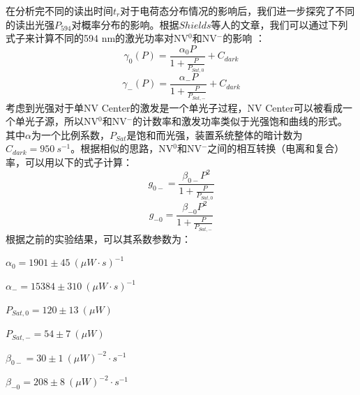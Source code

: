 \documentclass[type = bachelor]{whu-thesis}
\begin{document}
在分析完不同的读出时间$t_r$对于电荷态分布情况的影响后，我们进一步探究了不同的读出光强$P_{594}$对概率分布的影响。根据$Shields$等人的文章，我们可以通过下列式子来计算不同的594 nm的激光功率对NV$^0$和NV$^-$的影响 \cite{Shields2015}：
\begin{equation}
  \gamma_0(P)=\frac{\alpha_0 P}{1+\frac{P}{P_{Sat,0}}}+C_{dark}
  \label{equ: gamma_0}
\end{equation}
\begin{equation}
  \gamma_-(P)=\frac{\alpha_- P}{1+\frac{P}{P_{Sat,-}}}+C_{dark}
  \label{equ: gamma_-}
\end{equation}
考虑到光强对于单NV Center的激发是一个单光子过程，NV Center可以被看成一个单光子源，所以NV$^0$和NV$^-$的计数率和激发功率类似于光强饱和曲线的形式。其中$\alpha$为一个比例系数，$P_{Sat}$是饱和而光强，装置系统整体的暗计数为$C_{dark} = 950\ s^{-1}$。根据相似的思路，NV$^0$和NV$^-$之间的相互转换（电离和复合）率，可以用以下的式子计算：
\begin{equation}
  g_{0-} = \frac{\beta_{0-}P^2}{1+\frac{P}{P_{Sat,0}}}
  \label{equ: g_0-}
\end{equation}
\begin{equation}
  g_{-0} = \frac{\beta_{-0}P^2}{1+\frac{P}{P_{Sat,-}}}
  \label{equ: g_-0}
\end{equation}
根据之前的实验结果，可以其系数参数为\cite{Robledo2011}：

$\alpha_0 = 1901 \pm 45\ (\mu W \cdot s)^{-1}$

$\alpha_- = 15384 \pm 310\ (\mu W \cdot s)^{-1}$

$P_{Sat,0} = 120 \pm 13\ (\mu W)$

$P_{Sat,-} = 54 \pm 7\ (\mu W)$

$\beta_{0-} = 30 \pm 1\ (\mu W)^{-2} \cdot s^{-1}$

$\beta_{-0} = 208 \pm 8\ (\mu W)^{-2} \cdot s^{-1}$
\end{document}
